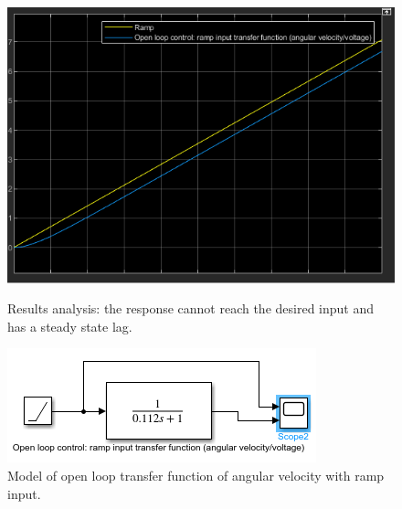 \documentclass[conference]{IEEEtran}
\begin{document}
\begin{figure}[htbp]
    \centering
    \begin{minipage}[b]{0.24\textwidth}
        \includegraphics[width=\textwidth]{./Graph/G3.png}
        \caption{Results analysis: the response cannot reach the desired input and has a steady state lag.}
    \end{minipage}
    \hfill
    \begin{minipage}[b]{0.24\textwidth}
        \centering
        \includegraphics[width=\textwidth]{./Graph/G3'.png}
        \caption{Model of open loop transfer function of angular velocity with ramp input.}
    \end{minipage}
\end{figure}
\end{document}

